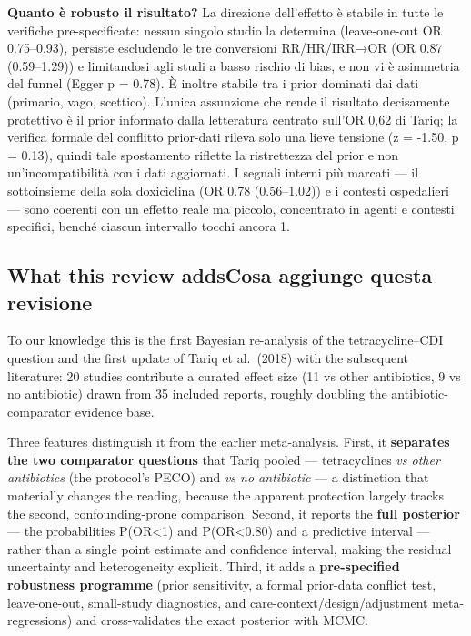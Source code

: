 \documentclass[
  letterpaper,
  DIV=11,
  numbers=noendperiod]{scrartcl}
\begin{document}
\textbf{Quanto è robusto il risultato?} La direzione dell'effetto è
stabile in tutte le verifiche pre-specificate: nessun singolo studio la
determina (leave-one-out OR 0.75--0.93), persiste escludendo le tre
conversioni RR/HR/IRR→OR (OR 0.87 (0.59--1.29)) e limitandosi agli studi
a basso rischio di bias, e non vi è asimmetria del funnel (Egger p =
0.78). È inoltre stabile tra i prior dominati dai dati (primario, vago,
scettico). L'unica assunzione che rende il risultato decisamente
protettivo è il prior informato dalla letteratura centrato sull'OR 0,62
di Tariq; la verifica formale del conflitto prior-dati rileva solo una
lieve tensione (z = -1.50, p = 0.13), quindi tale spostamento riflette
la ristrettezza del prior e non un'incompatibilità con i dati
aggiornati. I segnali interni più marcati --- il sottoinsieme della sola
doxiciclina (OR 0.78 (0.56--1.02)) e i contesti ospedalieri --- sono
coerenti con un effetto reale ma piccolo, concentrato in agenti e
contesti specifici, benché ciascun intervallo tocchi ancora 1.

\subsection{\texorpdfstring{{What this review adds}{Cosa aggiunge questa
revisione}}{What this review addsCosa aggiunge questa revisione}}\label{what-this-review-addscosa-aggiunge-questa-revisione}

To our knowledge this is the first Bayesian re-analysis of the
tetracycline--CDI question and the first update of Tariq et al.~(2018)
with the subsequent literature: 20 studies contribute a curated effect
size (11 vs other antibiotics, 9 vs no antibiotic) drawn from 35
included reports, roughly doubling the antibiotic-comparator evidence
base.

Three features distinguish it from the earlier meta-analysis. First, it
\textbf{separates the two comparator questions} that Tariq pooled ---
tetracyclines \emph{vs other antibiotics} (the protocol's PECO) and
\emph{vs no antibiotic} --- a distinction that materially changes the
reading, because the apparent protection largely tracks the second,
confounding-prone comparison. Second, it reports the \textbf{full
posterior} --- the probabilities P(OR\textless1) and P(OR\textless0.80)
and a predictive interval --- rather than a single point estimate and
confidence interval, making the residual uncertainty and heterogeneity
explicit. Third, it adds a \textbf{pre-specified robustness programme}
(prior sensitivity, a formal prior-data conflict test, leave-one-out,
small-study diagnostics, and care-context/design/adjustment
meta-regressions) and cross-validates the exact posterior with MCMC.
\end{document}
